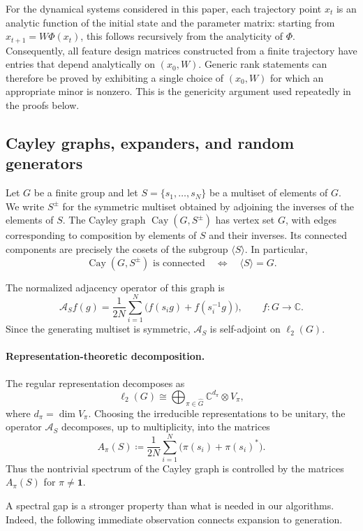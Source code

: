 \documentclass[11pt]{article}
\theoremstyle{plain}
\theoremstyle{definition}
\theoremstyle{remark}
\begin{document}
For the dynamical systems considered in this paper, each trajectory point
\(x_t\) is an analytic function of the initial state and the parameter matrix:
starting from \(x_{t+1}=W\Phi(x_t)\), this follows recursively from the
analyticity of \(\Phi\). Consequently, all feature design matrices constructed
from a finite trajectory have entries that depend analytically on
\((x_0,W)\). Generic rank statements can therefore be proved by exhibiting
a single choice of \((x_0,W)\) for which an appropriate minor is nonzero.
This is the genericity argument used repeatedly in the proofs below.


\subsection{Cayley graphs, expanders, and random generators}
\label{app:cayley}

Let \(G\) be a finite group and let
\(S=\{s_1,\ldots,s_N\}\) be a multiset of elements of \(G\). We write
\(S^{\pm}\) for the symmetric multiset obtained by adjoining the inverses of
the elements of \(S\). The Cayley graph
\(\operatorname{Cay}(G,S^{\pm})\) has vertex set \(G\), with edges
corresponding to composition by elements of \(S\) and their inverses. Its
connected components are precisely the cosets of the subgroup
\(\langle S\rangle\). In particular,
\[
\operatorname{Cay}(G,S^{\pm})\text{ is connected}
\quad\Longleftrightarrow\quad
\langle S\rangle=G.
\]

The normalized adjacency operator of this graph is
\[
\mathcal A_S f(g)
=
\frac{1}{2N}\sum_{i=1}^N
\bigl(f(s_i g)+f(s_i^{-1}g)\bigr),
\qquad
f:G\to\mathbb C.
\]
Since the generating multiset is symmetric, \(\mathcal A_S\) is self-adjoint
on \(\ell_2(G)\).

\paragraph{Representation-theoretic decomposition.}
The regular representation decomposes as
\[
\ell_2(G)
\cong
\bigoplus_{\pi\in\widehat G}
\mathbb C^{d_\pi}\otimes V_\pi,
\]
where \(d_\pi=\dim V_\pi\). Choosing the irreducible representations to be
unitary, the operator \(\mathcal A_S\) decomposes, up to multiplicity, into
the matrices
\[
A_\pi(S)
\coloneqq
\frac{1}{2N}\sum_{i=1}^N
\bigl(\pi(s_i)+\pi(s_i)^\ast\bigr).
\]
Thus the nontrivial spectrum of the Cayley graph is controlled by the matrices
\(A_\pi(S)\) for \(\pi\neq\mathbf 1\).

A spectral gap is a stronger property than what is needed in our algorithms.
Indeed, the following immediate observation connects expansion to generation.
\end{document}
